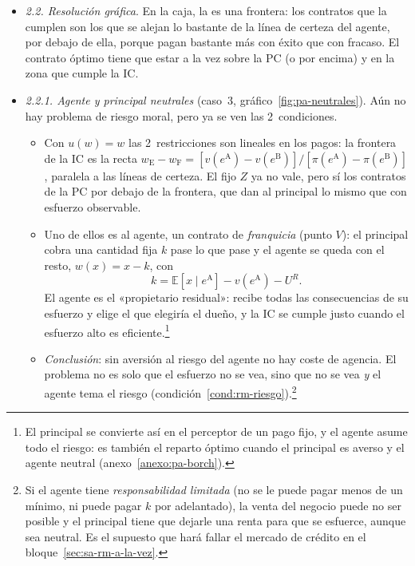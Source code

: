 \documentclass[11pt]{article}
\begin{document}
\begin{itemize}
\begin{itemize}
  \end{itemize}
\item \emph{2.2. Resolución gráfica}. En la caja, la  es una frontera: los contratos que la cumplen son los que se alejan lo bastante de la línea de certeza del agente, por debajo de ella, porque pagan bastante más con éxito que con fracaso. El contrato óptimo tiene que estar a la vez sobre la PC (o por encima) y en la zona que cumple la IC.
\item \emph{2.2.1. Agente y principal neutrales} (caso~3, gráfico~\ref{fig:pa-neutrales}). Aún no hay problema de riesgo moral, pero ya se ven las 2~condiciones.
  \begin{itemize}
  \item Con $u(w)=w$ las 2~restricciones son lineales en los pagos: la frontera de la IC es la recta $w_{\mathrm{E}}-w_{\mathrm{F}}=[v(e^{\mathrm{A}})-v(e^{\mathrm{B}})]/[\pi(e^{\mathrm{A}})-\pi(e^{\mathrm{B}})]$, paralela a las líneas de certeza. El fijo $Z$ ya no vale, pero sí los contratos de la PC por debajo de la frontera, que dan al principal lo mismo que con esfuerzo observable.
  \item Uno de ellos es  al agente, un contrato de \emph{franquicia} (punto $V$): el principal cobra una cantidad fija $k$ pase lo que pase y el agente se queda con el resto, $w(x)=x-k$, con
  \begin{equation}
  k=\mathbb{E}[x\mid e^{\mathrm{A}}]-v(e^{\mathrm{A}})-U^R .
  \end{equation}
  El agente es el «propietario residual»: recibe todas las consecuencias de su esfuerzo y elige el que elegiría el dueño, y la IC se cumple justo cuando el esfuerzo alto es eficiente.\footnote{El principal se convierte así en el perceptor de un pago fijo, y el agente asume todo el riesgo: es también el reparto óptimo cuando el principal es averso y el agente neutral (anexo~\ref{anexo:pa-borch}).}
  \item \emph{Conclusión}: sin aversión al riesgo del agente no hay coste de agencia. El problema no es solo que el esfuerzo no se vea, sino que no se vea \emph{y} el agente tema el riesgo (condición~\ref{cond:rm-riesgo}).\footnote{Si el agente tiene \emph{responsabilidad limitada} (no se le puede pagar menos de un mínimo, ni puede pagar $k$ por adelantado), la venta del negocio puede no ser posible y el principal tiene que dejarle una renta para que se esfuerce, aunque sea neutral\nocite{LaffontMartimort2002Theory}. Es el supuesto que hará fallar el mercado de crédito en el bloque~\ref{sec:sa-rm-a-la-vez}.}
  \end{itemize}
\end{itemize}
\end{document}
